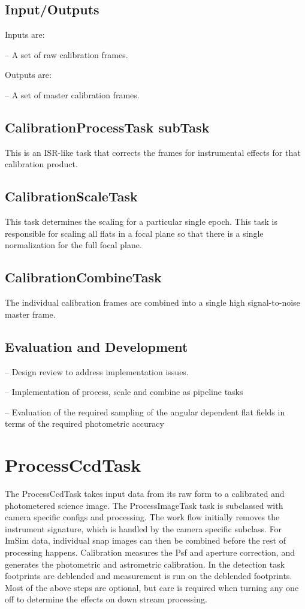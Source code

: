 \documentclass[prd, nofootinbib, floatfix, 11pt,tightenlines,times]{article}
\begin{document}
\subsection{Input/Outputs}
Inputs are:

-- A set of raw calibration frames.

Outputs are:

-- A set of master calibration frames.

\subsection{CalibrationProcessTask subTask}
This is an ISR-like task that corrects the frames for instrumental effects for that calibration
product.

\subsection{CalibrationScaleTask}
This task determines the scaling for a particular single epoch.  This task is responsible for
scaling all flats in a focal plane so that there is a single normalization for the full focal plane.

\subsection{CalibrationCombineTask}
The individual calibration frames are combined into a single high signal-to-noise master frame. 

\subsection{Evaluation and Development}

-- Design review to address implementation issues.

-- Implementation of process, scale and combine as pipeline tasks

-- Evaluation of the required sampling of the angular dependent flat
fields in terms of the required photometric accuracy



\section{ProcessCcdTask\label{processccdsec}} 
The ProcessCcdTask takes input data from its raw form to a calibrated
and photometered science image. The ProcessImageTask task is
subclassed with camera specific configs and processing. The work flow
initially removes the instrument signature, which is handled by the
camera specific subclass.  For ImSim data, individual snap images can
then be combined before the rest of processing happens. Calibration
measures the Psf and aperture correction, and generates the
photometric and astrometric calibration.  In the detection task
footprints are deblended and measurement is run on the deblended
footprints.  Most of the above steps are optional, but care is
required when turning any one off to determine the effects on down
stream processing.
\end{document}
